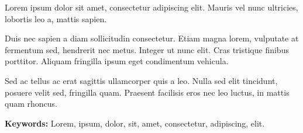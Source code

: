 
Lorem ipsum dolor sit amet, consectetur adipiscing elit.
Mauris vel nunc ultricies, lobortis leo a, mattis sapien.

Duis nec sapien a diam sollicitudin consectetur.
Etiam magna lorem, vulputate at fermentum sed, hendrerit nec metus.
Integer ut nunc elit.
Cras tristique finibus porttitor.
Aliquam fringilla ipsum eget condimentum vehicula.

Sed ac tellus ac erat sagittis ullamcorper quis a leo.
Nulla sed elit tincidunt, posuere velit sed, fringilla quam.
Praesent facilisis eros nec leo luctus, in mattis quam rhoncus.

\begin{singlespace}
    \textbf{Keywords:} Lorem, ipsum, dolor, sit, amet, consectetur, adipiscing, elit.
\end{singlespace}
